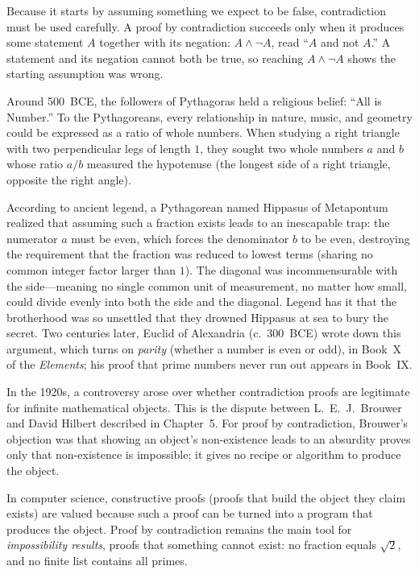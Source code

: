 Because it starts by assuming something we expect to be false, contradiction must be used carefully. A proof by contradiction succeeds only when it produces some statement $A$ together with its negation: $A \land \neg A$, read ``$A$ and not $A$.'' A statement and its negation cannot both be true, so reaching $A \land \neg A$ shows the starting assumption was wrong.

\begin{historybox}
Around 500~BCE, the followers of Pythagoras held a religious belief: ``All is Number.'' To the Pythagoreans, every relationship in nature, music, and geometry could be expressed as a ratio of whole numbers. When studying a right triangle with two perpendicular legs of length $1$, they sought two whole numbers $a$ and $b$ whose ratio $a/b$ measured the hypotenuse (the longest side of a right triangle, opposite the right angle).

According to ancient legend, a Pythagorean named Hippasus of Metapontum realized that assuming such a fraction exists leads to an inescapable trap: the numerator $a$ must be even, which forces the denominator $b$ to be even, destroying the requirement that the fraction was reduced to lowest terms (sharing no common integer factor larger than $1$). The diagonal was incommensurable with the side---meaning no single common unit of measurement, no matter how small, could divide evenly into both the side and the diagonal. Legend has it that the brotherhood was so unsettled that they drowned Hippasus at sea to bury the secret. Two centuries later, Euclid of Alexandria (c.~300~BCE) wrote down this argument, which turns on \emph{parity} (whether a number is even or odd), in Book~X of the \emph{Elements}; his proof that prime numbers never run out appears in Book~IX.

In the 1920s, a controversy arose over whether contradiction proofs are legitimate for infinite mathematical objects. This is the dispute between L.~E.~J.~Brouwer and David Hilbert described in Chapter~5. For proof by contradiction, Brouwer's objection was that showing an object's non-existence leads to an absurdity proves only that non-existence is impossible; it gives no recipe or algorithm to produce the object.

In computer science, constructive proofs (proofs that build the object they claim exists) are valued because such a proof can be turned into a program that produces the object. Proof by contradiction remains the main tool for \emph{impossibility results}, proofs that something cannot exist: no fraction equals $\sqrt{2}$, and no finite list contains all primes.
\end{historybox}

